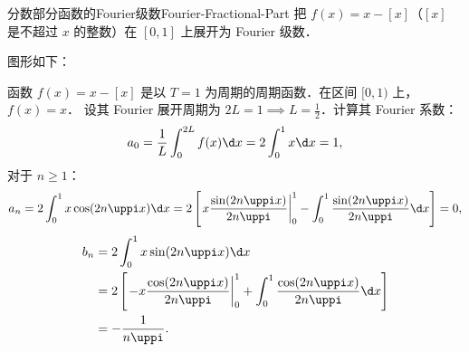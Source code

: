 \begin{problem}{分数部分函数的Fourier级数}{Fourier-Fractional-Part}
    把 $f(x) = x - [x]$（$[x]$ 是不超过 $x$ 的整数）在 $[0, 1]$ 上展开为 Fourier 级数．
\end{problem}

\begin{solution}
    图形如下：
    \begin{center}
    \end{center}

    函数 $f(x) = x - [x]$ 是以 $T = 1$ 为周期的周期函数．在区间 $[0, 1)$ 上，$f(x) = x$．
    设其 Fourier 展开周期为 $2L = 1 \implies L = \frac{1}{2}$．计算其 Fourier 系数：
    \begin{equation}\label{eq:frac-a0}
        a_0 = \frac{1}{L} \int_{0}^{2L} f(x) \d x = 2 \int_{0}^{1} x \d x = 1,
    \end{equation}
    对于 $n \geqslant 1$：
    \begin{equation}\label{eq:frac-an}
        a_n = 2 \int_{0}^{1} x \cos(2n\uppi x) \d x = 2 \left[ \left. x \frac{\sin(2n\uppi x)}{2n\uppi} \right|_{0}^{1} - \int_{0}^{1} \frac{\sin(2n\uppi x)}{2n\uppi} \d x \right] = 0,
    \end{equation}
    \begin{equation}\label{eq:frac-bn}
        \begin{aligned}
            b_n & = 2 \int_{0}^{1} x \sin(2n\uppi x) \d x                                                                                          \\
                & = 2 \left[ \left. -x \frac{\cos(2n\uppi x)}{2n\uppi} \right|_{0}^{1} + \int_{0}^{1} \frac{\cos(2n\uppi x)}{2n\uppi} \d x \right] \\
                & = -\frac{1}{n\uppi}.
        \end{aligned}
    \end{equation}


\end{solution}
